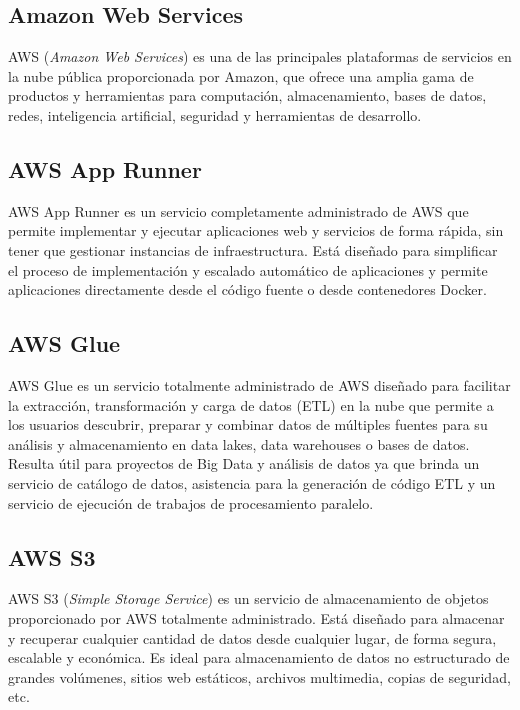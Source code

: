 \subsection{Amazon Web Services}

AWS (\textit{Amazon Web Services}) \citep{aws}  es una de las principales plataformas de servicios en la nube pública proporcionada por Amazon, que ofrece una amplia gama de productos y herramientas para computación, almacenamiento, bases de datos, redes, inteligencia artificial, seguridad y herramientas de desarrollo.


\subsection{AWS App Runner}

AWS App Runner \citep{aws_app_runner} es un servicio completamente administrado de AWS que permite implementar y ejecutar aplicaciones web y servicios de forma rápida, sin tener que gestionar instancias de infraestructura. Está diseñado para simplificar el proceso de implementación y escalado automático de aplicaciones y permite aplicaciones directamente desde el código fuente o desde contenedores Docker.



\subsection{AWS Glue}

AWS Glue \citep{aws_glue} es un servicio totalmente administrado de AWS diseñado para facilitar la extracción, transformación y carga de datos (ETL) en la nube que permite a los usuarios descubrir, preparar y combinar datos de múltiples fuentes para su análisis y almacenamiento en data lakes, data warehouses o bases de datos. Resulta útil para proyectos de Big Data y análisis de datos ya que brinda un servicio de catálogo de datos, asistencia para la generación de código ETL y un servicio de ejecución de trabajos de procesamiento paralelo.


\subsection{AWS S3}

AWS S3 (\textit{Simple Storage Service}) \citep{aws_s3} es un servicio de almacenamiento de objetos proporcionado por AWS totalmente administrado. Está diseñado para almacenar y recuperar cualquier cantidad de datos desde cualquier lugar, de forma segura, escalable y económica. Es ideal para almacenamiento de datos no estructurado de grandes volúmenes, sitios web estáticos, archivos multimedia, copias de seguridad, etc.

